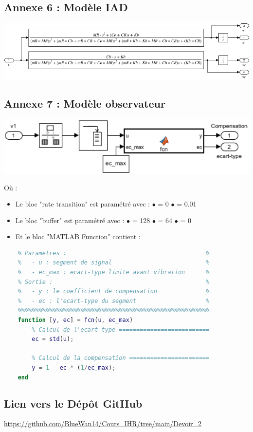 \documentclass[a4paper,12pt]{article}
\begin{document}
    \subsection{Annexe 6 : Modèle IAD} \label{Annexe:modelIAD}
    \begin{center}
        \includegraphics[width=16cm]{./img/model_IAD.png}
    \end{center}
    

    \subsection{Annexe 7 : Modèle observateur} \label{Annexe:modelObs}
    \begin{center}
        \includegraphics[width=14cm]{./img/model_observateur.png}
    \end{center}
    Où :
    \begin{itemize}
        \item[] Le bloc "rate transition" est paramétré avec : 
            \subitem $\bullet$  = 0
            \subitem $\bullet$  = 0.01
        \item[] Le bloc "buffer" est paramétré avec : 
            \subitem$\bullet$  = 128
            \subitem$\bullet$  = 64
            \subitem$\bullet$  = 0
        \item[] Et le bloc "MATLAB Function" contient :
    \end{itemize}
    \begin{lstlisting}[caption={Fonction simulink de calcul du compensateur}, language=Matlab]
    %%%%%%%%%%%%%%%%%%%%%%%%%%%%%%%%%%%%%%%%%%%%%%%%%%%%%%%
    % Parametres :                                        %
    %   - u : segment de signal                           %
    %   - ec_max : ecart-type limite avant vibration      %
    % Sortie :                                            %
    %   - y : le coefficient de compensation              %
    %   - ec : l'ecart-type du segment                    %
    %%%%%%%%%%%%%%%%%%%%%%%%%%%%%%%%%%%%%%%%%%%%%%%%%%%%%%%
    function [y, ec] = fcn(u, ec_max)
        % Calcul de l'ecart-type ==========================
        ec = std(u);

        % Calcul de la compensation =======================
        y = 1 - ec * (1/ec_max);
    end
    \end{lstlisting}
    
    
    \subsection{Lien vers le Dépôt GitHub}
    \url{https://github.com/BlueWan14/Cours_IHR/tree/main/Devoir_2}
    
\end{document}
